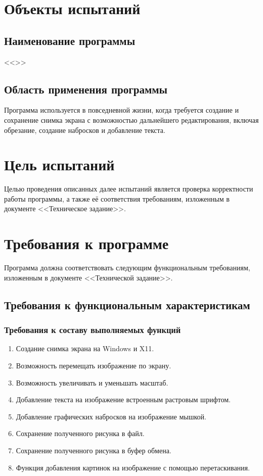 \documentclass[a4paper,12pt]{article}
\begin{document}
  \CRTpreamble

  \section{Объекты испытаний}
  \subsection{Наименование программы}
  <<\CRTname>>

  \subsection{Область применения программы}
  Программа используется в повседневной жизни, когда требуется создание и сохранение снимка экрана с возможностью дальнейшего редактирования, включая обрезание, создание набросков и добавление текста.

  \newpage
  \section{Цель испытаний}
  Целью проведения описанных далее испытаний является проверка корректности работы программы,
  а также её соответствия требованиям, изложенным в документе <<Техническое задание>>.

  \newpage
  \section{Требования к программе}
  Программа должна соответствовать следующим функциональным требованиям, изложенным в документе <<Технической задание>>.
  \subsection{Требования к функциональным характеристикам}
  \subsubsection{Требования к составу выполняемых функций}
  \label{sec:funcs}
  \begin{enumerate}
    \item Создание снимка экрана на Windows и X11.
    \item Возможность перемещать изображение по экрану.
    \item Возможность увеличивать и уменьшать масштаб.
    \item Добавление текста на изображение встроенным растровым шрифтом.
    \item Добавление графических набросков на изображение мышкой.
    \item Сохранение полученного рисунка в файл.
    \item Сохранение полученного рисунка в буфер обмена.
    \item Функция добавления картинок на изображение с помощью перетаскивания.
  \end{enumerate}
\end{document}
